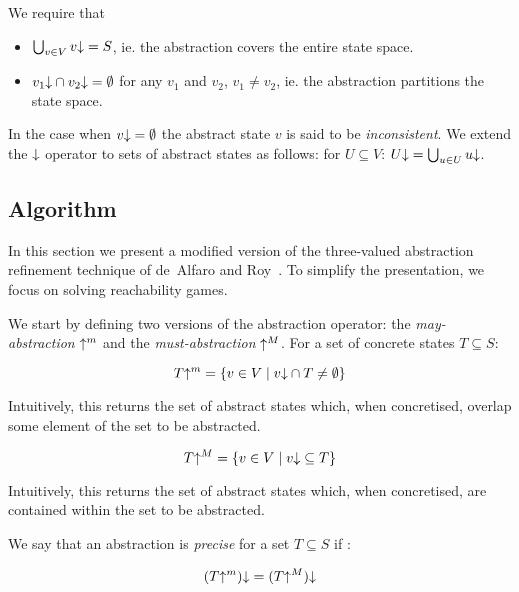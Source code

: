 We require that 
\begin{itemize}
    \item $\bigcup_{v\in V}v\mathord{\downarrow} = S$, ie. the abstraction covers the entire state space. 
    \item $v_1\mathord{\downarrow}\cap v_2\mathord{\downarrow} = \emptyset$ for any $v_1$ and $v_2$, $v_1 \neq v_2$, ie. the abstraction partitions the state space.
\end{itemize}

In the case when $v\mathord{\downarrow} = \emptyset$ the abstract state $v$ is said to be \emph{inconsistent}. We extend the $\mathord{\downarrow}$ operator to sets of abstract states as follows: for $U\subseteq V$: $U\mathord{\downarrow} = \bigcup_{u\in U}u\mathord{\downarrow}$.

\subsection{Algorithm}
\label{sec:threeval_generic}

In this section we present a modified version of the three-valued abstraction refinement technique of de~Alfaro and Roy~\cite{Alfaro_Roy_07}. To simplify the presentation, we focus on solving reachability games. 

We start by defining two versions of the abstraction operator: the \emph{may-abstraction} $\mathord{\uparrow^m}$ and the \emph{must-abstraction} $\mathord{\uparrow^M}$. For a set of concrete states $T \subseteq S$:

\begin{equation}
T\mathord{\uparrow^m} = \{v\in V\mid v\mathord{\downarrow} \cap T \neq \emptyset\} 
\end{equation}

Intuitively, this returns the set of abstract states which, when concretised, overlap some element of the set to be abstracted.

\begin{equation}
T\mathord{\uparrow^M} = \{v\in V\mid v\mathord{\downarrow} \subseteq T \}
\end{equation}

Intuitively, this returns the set of abstract states which, when concretised, are contained within the set to be abstracted.

We say that an abstraction is \emph{precise} for a set $T\subseteq S$ if :

\begin{equation}
(T\mathord{\uparrow^m})\mathord{\downarrow} = (T\mathord{\uparrow^M})\mathord{\downarrow}
\end{equation}

